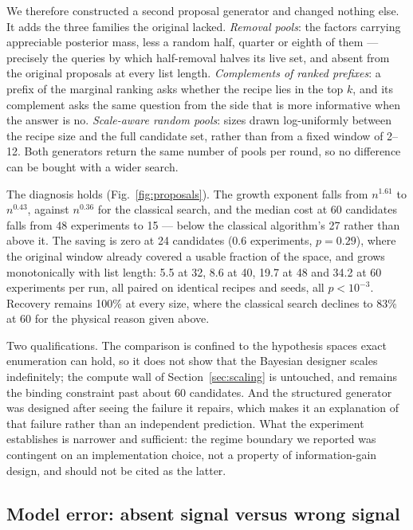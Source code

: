 \documentclass[11pt]{article}
\begin{document}
We therefore constructed a second proposal generator and changed nothing else.
It adds the three families the original lacked. \emph{Removal pools}: the
factors carrying appreciable posterior mass, less a random half, quarter or
eighth of them --- precisely the queries by which half-removal halves its live
set, and absent from the original proposals at every list length.
\emph{Complements of ranked prefixes}: a prefix of the marginal ranking asks
whether the recipe lies in the top $k$, and its complement asks the same
question from the side that is more informative when the answer is no.
\emph{Scale-aware random pools}: sizes drawn log-uniformly between the recipe
size and the full candidate set, rather than from a fixed window of 2--12.
Both generators return the same number of pools per round, so no difference can
be bought with a wider search.

The diagnosis holds (Fig.~\ref{fig:proposals}). The growth exponent falls from
$n^{1.61}$ to $n^{0.43}$, against $n^{0.36}$ for the classical search, and the
median cost at 60 candidates falls from 48 experiments to 15 --- below the
classical algorithm's 27 rather than above it. The saving is zero at 24
candidates (0.6 experiments, $p = 0.29$), where the original window already
covered a usable fraction of the space, and grows monotonically with list
length: 5.5 at 32, 8.6 at 40, 19.7 at 48 and 34.2 at 60 experiments per run,
all paired on identical recipes and seeds, all $p < 10^{-3}$. Recovery remains
100\% at every size, where the classical search declines to 83\% at 60 for the
physical reason given above.

Two qualifications. The comparison is confined to the hypothesis spaces exact
enumeration can hold, so it does not show that the Bayesian designer scales
indefinitely; the compute wall of Section~\ref{sec:scaling} is untouched, and
remains the binding constraint past about 60 candidates. And the structured
generator was designed after seeing the failure it repairs, which makes it an
explanation of that failure rather than an independent prediction. What the
experiment establishes is narrower and sufficient: the regime boundary we
reported was contingent on an implementation choice, not a property of
information-gain design, and should not be cited as the latter.

\subsection{Model error: absent signal versus wrong signal}
\label{sec:calibration}
\end{document}
